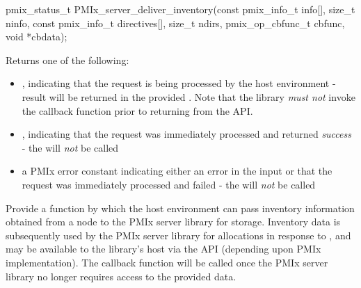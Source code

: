 \format

\cspecificstart
\begin{codepar}
pmix_status_t
PMIx_server_deliver_inventory(const pmix_info_t info[],
                              size_t ninfo,
                              const pmix_info_t directives[],
                              size_t ndirs,
                              pmix_op_cbfunc_t cbfunc,
                              void *cbdata);
\end{codepar}
\cspecificend

\begin{arglist}
\end{arglist}

Returns one of the following:

\begin{itemize}
    \item {}, indicating that the request is being processed by the host environment - result will be returned in the provided . Note that the library \emph{must not} invoke the callback function prior to returning from the \ac{API}.
    \item {}, indicating that the request was immediately processed and returned \textit{success} - the  will \textit{not} be called
    \item a PMIx error constant indicating either an error in the input or that the request was immediately processed and failed - the  will \textit{not} be called
\end{itemize}


\descr

Provide a function by which the host environment can pass inventory information obtained from a node to the \ac{PMIx} server library for storage. Inventory data is subsequently used by the \ac{PMIx} server library for allocations in response to , and may be available to the library's host via the  \ac{API} (depending upon \ac{PMIx} implementation). The  callback function will be called once the \ac{PMIx} server library no longer requires access to the provided data.

